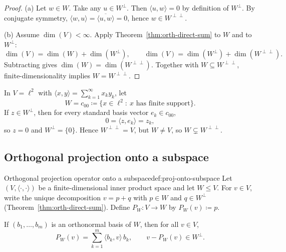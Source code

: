 \begin{proof}
(a) Let $w\in W$. Take any $u\in W^\perp$. Then $\langle u,w\rangle=0$ by definition of $W^\perp$.
By conjugate symmetry, $\langle w,u\rangle=\overline{\langle u,w\rangle}=0$, hence $w\in W^{\perp\perp}$.

(b) Assume $\dim(V)<\infty$. Apply Theorem~\ref{thm:orth-direct-sum} to $W$ and to $W^\perp$:
\[
\dim(V)=\dim(W)+\dim(W^\perp),\qquad
\dim(V)=\dim(W^\perp)+\dim(W^{\perp\perp}).
\]
Subtracting gives $\dim(W)=\dim(W^{\perp\perp})$.
Together with $W\subseteq W^{\perp\perp}$, finite-dimensionality implies $W=W^{\perp\perp}$.
\end{proof}

\begin{examplebox}[title={Worked Example (Tutorial 10, Question 5(c)): strict inclusion in infinite dimensions}]
In $V=\ell^2$ with $\langle x,y\rangle=\sum_{k=1}^\infty x_k y_k$, let
\[
W=c_{00}\coloneqq \{x\in \ell^2:\ x\text{ has finite support}\}.
\]
If $z\in W^\perp$, then for every standard basis vector $e_k\in c_{00}$,
\[
0=\langle z,e_k\rangle=z_k,
\]
so $z=0$ and $W^\perp=\{0\}$. Hence $W^{\perp\perp}=V$, but $W\neq V$, so $W\subsetneq W^{\perp\perp}$.
\end{examplebox}

\subsection{Orthogonal projection onto a subspace}

\begin{definition}{Orthogonal projection operator onto a subspace}{def:proj-onto-subspace}
Let $(V,\langle\cdot,\cdot\rangle)$ be a finite-dimensional inner product space and let $W\le V$.
For $v\in V$, write the unique decomposition $v=p+q$ with $p\in W$ and $q\in W^\perp$ (Theorem~\ref{thm:orth-direct-sum}).
Define $P_W:V\to W$ by $P_W(v)\coloneqq p$.
\end{definition}

\begin{keyformula}[title={Key Formula: projection using an orthonormal basis of $W$}]
If $(b_1,\dots,b_m)$ is an orthonormal basis of $W$, then for all $v\in V$,
\[
P_W(v)=\sum_{k=1}^m \langle b_k,v\rangle\,b_k,
\qquad
v-P_W(v)\in W^\perp.
\]
\end{keyformula}

